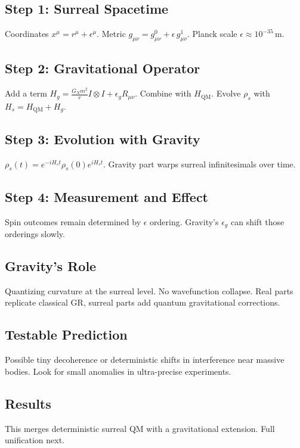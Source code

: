 \documentclass{article}
\begin{document}
\subsection{Step 1: Surreal Spacetime}
Coordinates \(x^\mu = r^\mu + \epsilon^\mu\). Metric \(g_{\mu\nu} = g_{\mu\nu}^0 + \epsilon\,g_{\mu\nu}^1\). Planck scale \(\epsilon \approx 10^{-35}\,\mathrm{m}\).

\subsection{Step 2: Gravitational Operator}
Add a term \(H_g = \frac{G_N m^2}{r} I \otimes I + \epsilon_g R_{\mu\nu}\). Combine with \(H_{\mathrm{QM}}\). Evolve \(\rho_s\) with \(H_s = H_{\mathrm{QM}} + H_g\).

\subsection{Step 3: Evolution with Gravity}
\(\rho_s(t) = e^{-iH_s t}\rho_s(0) e^{iH_s t}\). Gravity part warps surreal infinitesimals over time.

\subsection{Step 4: Measurement and Effect}
Spin outcomes remain determined by \(\epsilon\) ordering. Gravity's \(\epsilon_g\) can shift those orderings slowly.

\subsection{Gravity's Role}
Quantizing curvature at the surreal level. No wavefunction collapse. Real parts replicate classical GR, surreal parts add quantum gravitational corrections.

\subsection{Testable Prediction}
Possible tiny decoherence or deterministic shifts in interference near massive bodies. Look for small anomalies in ultra-precise experiments.

\subsection{Results}
This merges deterministic surreal QM with a gravitational extension. Full unification next.
\end{document}
